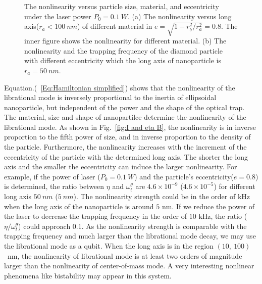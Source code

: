 \documentclass[pra,aps,superscriptaddress,showpacs,preprint]{revtex4}%
\begin{document}
\begin{figure}
\centering
{}
\caption{The nonlinearity versus particle size, material, and eccentricity under the laser power $P_{0}=0.1~W$. (a) The nonlinearity versus long axis($r_{a}<100~nm$) of different material in $e=\sqrt{1-r_b^2/r_a^2}=0.8$. The inner figure shows the nonlinearity for different material.
(b) The nonlinearity and the trapping frequency of the diamond particle with different eccentricity which the long axis of nanoparticle is $r_{a}=50~nm$.}
\label{fig:I and eta}
\end{figure}

Equation.(~\ref{Eq:Hamiltonian simplified}) shows that the nonlinearity of the librational mode is inversely proportional to the inertia of ellipsoidal nanoparticle, but independent of the power and the shape of the optical trap.  The material, size and shape of nanopartilce determine the nonlinearity of the librational mode. As shown in Fig.~\ref{fig:I and eta B}, the nonlinearity is in inverse proportion to the fifth power of size, and in inverse proportion to the density of the particle. Furthermore, the nonlinearity increases with the increment of the eccentricity of the particle with the determined long axis. The shorter the long axis and the smaller the eccentricity can induce the larger nonlinearity.
For example, if the power of laser ($P_{0}=0.1~W$) and the particle's eccentricity($e=0.8$) is determined, the ratio between $\eta$ and $\omega_{t}^{\theta}$ are $4.6\times10^{-9}$ ($4.6\times10^{-5}$) for different long axis $50~nm$ ($5~nm$).
 The nonlinearity strength could be in the order of kHz when the long axis of the nanoparticle is around $5$ nm. If we reduce the power of the laser to decrease the trapping
 frequency in the order of $10$ kHz, the ratio ($\eta/\omega_{t}^{\theta}$) could approach $0.1$.  As the nonlinearity strength is comparable with the trapping frequency and  much larger than the librational mode decay, we may use the librational mode as a qubit. When the long axis is in the region $(10,~100)$~nm,  the nonlinearity of librational mode is at least two orders of magnitude larger than the nonlinearity of center-of-mass mode. A very interesting nonlinear phenomena like bistability may appear in this system.
\end{document}
